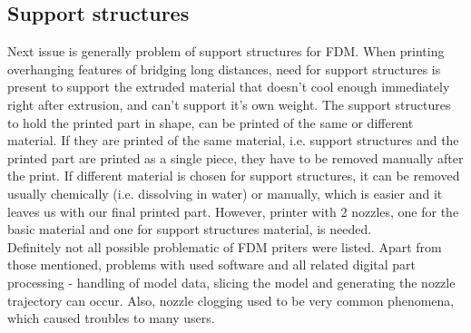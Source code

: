 \documentclass[a4paper, 11pt, reqno]{report}
\begin{document}
\subsection{Support structures}
	Next issue is generally problem of support structures for FDM. When printing overhanging features of bridging long distances, need for support structures is present to support the extruded material that doesn't cool enough immediately right after extrusion, and can't support it's own weight. The support structures to hold the printed part in shape, can be printed of the same or different material. If they are printed of the same material, i.e. support structures and the printed part are printed as a single piece, they have to be removed manually after the print. If different material is chosen for support structures, it can be removed usually chemically (i.e. dissolving in water) or manually, which is easier and it leaves us with our final printed part. However, printer with 2 nozzles, one for the basic material and one for support structures material, is needed.
\\[20pt]

	Definitely not all possible problematic of FDM priters were listed. Apart from those mentioned, problems with used software and all related digital part processing - handling of model data, slicing the model and generating the nozzle trajectory can occur. Also, nozzle clogging used to be very common phenomena, which caused troubles to many users.

\clearpage
\end{document}
